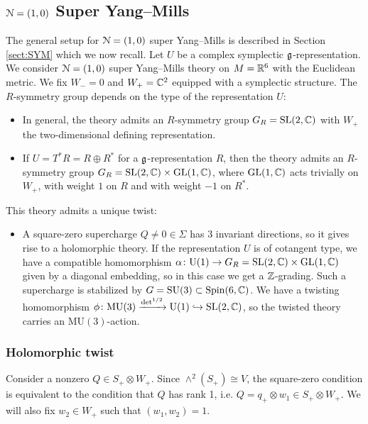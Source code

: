 \documentclass[10pt, oneside]{article}
\newcommand{\MU}{\mathrm{MU}}
\renewcommand{\U}{\mathrm{U}}
\begin{document}
\subsection{\texorpdfstring{$\mathcal N=(1, 0)$}{N=(1, 0)} Super Yang--Mills}

The general setup for $\mathcal N=(1, 0)$ super Yang--Mills is described in Section \ref{sect:SYM} which we now recall. Let $U$ be a complex symplectic $\mathfrak g$-representation. We consider $\mathcal N=(1, 0)$ super Yang--Mills theory on $M=\mathbb R^6$ with the Euclidean metric. We fix $W_- = 0$ and $W_+=\mathbb C^2$ equipped with a symplectic structure. The $R$-symmetry group depends on the type of the representation $U$:
\begin{itemize}
\item In general, the theory admits an $R$-symmetry group $G_R=\mathrm{SL}(2, \mathbb C)$ with $W_+$ the two-dimensional defining representation.

\item If $U = T^* R=R\oplus R^*$ for a $\mathfrak g$-representation $R$, then the theory admits an $R$-symmetry group $G_R=\mathrm{SL}(2, \mathbb C)\times \mathrm{GL}(1, \mathbb C)$, where $\mathrm{GL}(1, \mathbb C)$ acts trivially on $W_+$, with weight $1$ on $R$ and with weight $-1$ on $R^*$.
\end{itemize}

This theory admits a unique twist:
\begin{itemize}
\item A square-zero supercharge $Q\neq 0\in\Sigma$ has 3 invariant directions, so it gives rise to a holomorphic theory. If the representation $U$ is of cotangent type, we have a compatible homomorphism $\alpha\colon \U(1)\rightarrow G_R=\SL(2, \CC)\times \GL(1, \CC)$ given by a diagonal embedding, so in this case we get a $\mathbb Z$-grading. Such a supercharge is stabilized by $G=\mathrm{SU}(3)\subset \mathrm{Spin}(6, \mathbb C)$. We have a twisting homomorphism $\phi\colon\MU(3)\xrightarrow{\det^{1/2}}\U(1)\hookrightarrow \SL(2, \CC)$, so the twisted theory carries an $\MU(3)$-action.
\end{itemize}

\subsubsection{Holomorphic twist}
\label{sect:6dholomorphictwist}

Consider a nonzero $Q\in S_+\otimes W_+$. Since $\wedge^2(S_+)\cong V$, the square-zero condition is equivalent to the condition that $Q$ has rank 1, i.e. $Q=q_+\otimes w_1\in S_+\otimes W_+$. We will also fix $w_2\in W_+$ such that $(w_1, w_2) = 1$.
\end{document}
